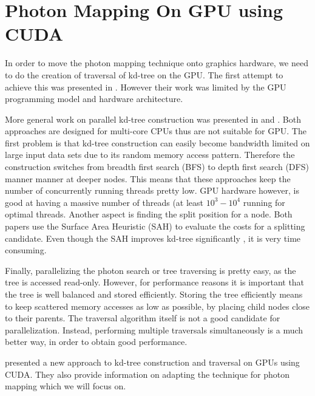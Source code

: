 
\section{Photon Mapping On GPU using CUDA} 

In order to move the photon mapping technique onto graphics hardware, we need to do the creation of traversal of kd-tree on the GPU. The first attempt to achieve this was presented in \cite{Purcell:2005:PMP:1198555.1198797}. However their work was limited by the GPU programming model and hardware architecture. 

More general work on parallel kd-tree construction was presented in \cite{popov:06:ESC} and \cite{Shevtsov_highlyparallel}. Both approaches are designed for multi-core CPUs thus are not suitable for GPU. The first problem is that kd-tree construction can easily become bandwidth limited on large input data sets due to its random memory access pattern. Therefore the construction switches from breadth first search (BFS) to depth first search (DFS) manner manner at deeper nodes. This means that these approaches keep the number of concurrently running threads pretty low. GPU hardware however, is good at having a massive number of threads (at least \(10^{3} - 10^{4}\) running for optimal threads\cite{Guide2012}. Another aspect is finding the split position for a node. Both papers use the Surface Area Heuristic (SAH)\cite{springerlink:10.1007/BF01911006} to evaluate the costs for a splitting candidate. Even though the SAH improves kd-tree significantly \cite{wald::PhD}, it is very time consuming. 

Finally, parallelizing the photon search or tree traversing is pretty easy, as the tree is accessed read-only. However, for performance reasons it is important that the tree is well balanced and stored efficiently. Storing the tree efficiently means to keep scattered memory accesses as low as possible, by placing child nodes close to their parents. The traversal algorithm itself is not a good candidate for parallelization. Instead, performing multiple traversals simultaneously is a much better way, in order to obtain good performance. 

\citeauthor{Zhou2008} presented a new approach to kd-tree construction and traversal on GPUs using CUDA\cite{Zhou2008}. They also provide information on adapting the technique for photon mapping which we will focus on.

